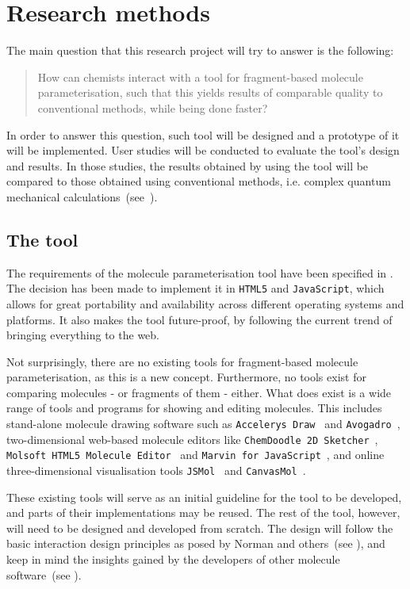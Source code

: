 \chapter{Research methods}

The main question that this research project will try to answer is the following:
\begin{quote}
How can chemists interact with a tool for fragment-based molecule parameterisation, such that this yields results of comparable quality to conventional methods, while being done faster?
\end{quote}
In order to answer this question, such tool will be designed and a prototype of it will be implemented. User studies will be conducted to evaluate the tool's design and results. In those studies, the results obtained by using the tool will be compared to those obtained using conventional methods, i.e. complex quantum mechanical calculations~(see~).


\section{The tool}

The requirements of the molecule parameterisation tool have been specified in . The decision has been made to implement it in \verb|HTML5| and \verb|JavaScript|, which allows for great portability and availability across different operating systems and platforms. It also makes the tool future-proof, by following the current trend of bringing everything to the web.

Not surprisingly, there are no existing tools for fragment-based molecule parameterisation, as this is a new concept. Furthermore, no tools exist for comparing molecules - or fragments of them - either. What does exist is a wide range of tools and programs for showing and editing molecules. This includes stand-alone molecule drawing software such as \verb|Accelerys Draw|~\cite{accelrys2012accelrys} and \verb|Avogadro|~\cite{hanwell2012avogadro}, two-dimensional web-based molecule editors like \verb|ChemDoodle 2D Sketcher|~\cite{ichemlabs2013chemdoodle}, \verb|Molsoft HTML5 Molecule Editor|~\cite{molsoft2012molsoft} and \verb|Marvin for JavaScript|~\cite{chemxon2013marvin}, and online three-dimensional visualisation tools \verb|JSMol|~\cite{hanson2013jsmol} and \verb|CanvasMol|~\cite{altered2013canvasmol}.

These existing tools will serve as an initial guideline for the tool to be developed, and parts of their implementations may be reused. The rest of the tool, however, will need to be designed and developed from scratch. The design will follow the basic interaction design principles as posed by Norman and others~(see ), and keep in mind the insights gained by the developers of other molecule software~(see ).


